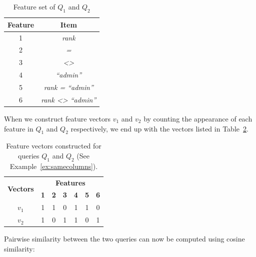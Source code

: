 \begin{table}[h!]
\centering
\caption{Feature set of $Q_1$ and $Q_2$}
\label{table:features}
    \begin{tabular}{|| c | c ||}
    \hline
    \textbf{Feature} & \textbf{Item} \\ \hline
    1 & \textit{rank} \\ \hline
    2 & \textit{=} \\ \hline
    3 & \textit{<>} \\ \hline
    4 & \textit{``admin''} \\ \hline
    5 & \textit{rank = ``admin''} \\ \hline
    6 & \textit{rank <> ``admin''} \\
    \hline
    \end{tabular}
\end{table}

When we construct feature vectors \textbf{$v_1$} and \textbf{$v_2$} by counting the appearance of each feature in $Q_1$ and $Q_2$ respectively, we end up with the vectors listed in Table~\ref{tab:vectors}.

\begin{table}[!htbp]
\centering
\begin{tabular}{|c|c|c|c|c|c|c|}
\hline
\multirow{2}{*}{\textbf{Vectors}} & \multicolumn{6}{c|}{\textbf{Features}}                                      \\ \cline{2-7} 
                                  & \textbf{1} & \textbf{2} & \textbf{3} & \textbf{4} & \textbf{5} & \textbf{6} \\ \hline
\textbf{$v_1$}                       & 1          & 1          & 0          & 1          & 1          & 0          \\ \hline
\textbf{$v_2$}                       & 1          & 0          & 1          & 1          & 0          & 1          \\ \hline
\end{tabular}
\caption{Feature vectors constructed for queries $Q_1$ and $Q_2$ (See Example~\ref{ex:samecolumns}).}
\label{tab:vectors}
\end{table}
Pairwise similarity between the two queries can now be computed using cosine similarity: 


